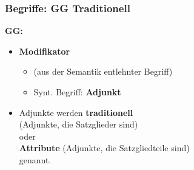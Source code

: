 \begin{frame}
\frametitle{Begriffe: GG \vs Traditionell}

\begin{minipage}[b]{0.45\textwidth}
	\textbf{GG:}
		\begin{itemize}
		\item \textbf{Modifikator}
		
		\begin{itemize}
			\item (aus der Semantik entlehnter Begriff)
			
			\item Synt. Begriff: \textbf{Adjunkt}
		\end{itemize}

\medskip
		\item Adjunkte werden \textbf{traditionell}\\
		 (Adjunkte, die Satzglieder sind)\\
		oder\\
		\textbf{Attribute} (Adjunkte, die Satzgliedteile sind)\\
		genannt.
		\end{itemize}	
  	\end{minipage}  
\begin{minipage}[b]{0.5\textwidth}
	\centering
\end{minipage}
  
\end{frame}


